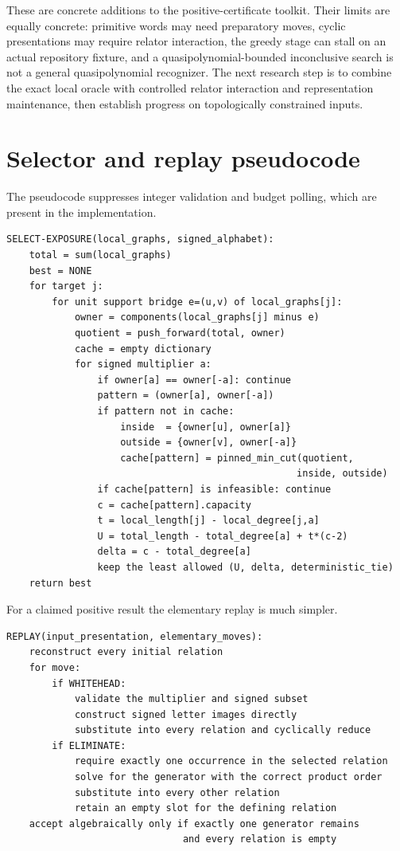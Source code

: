 \documentclass[11pt,letterpaper]{article}
\theoremstyle{definition}\newtheorem{definition}[theorem]{Definition}
\begin{document}
These are concrete additions to the positive-certificate toolkit. Their limits are equally concrete: primitive words may need preparatory moves, cyclic presentations may require relator interaction, the greedy stage can stall on an actual repository fixture, and a quasipolynomial-bounded inconclusive search is not a general quasipolynomial recognizer. The next research step is to combine the exact local oracle with controlled relator interaction and representation maintenance, then establish progress on topologically constrained inputs.

\appendix
\section{Selector and replay pseudocode}\label{app:code}
The pseudocode suppresses integer validation and budget polling, which are present in the implementation.
\begin{lstlisting}
SELECT-EXPOSURE(local_graphs, signed_alphabet):
    total = sum(local_graphs)
    best = NONE
    for target j:
        for unit support bridge e=(u,v) of local_graphs[j]:
            owner = components(local_graphs[j] minus e)
            quotient = push_forward(total, owner)
            cache = empty dictionary
            for signed multiplier a:
                if owner[a] == owner[-a]: continue
                pattern = (owner[a], owner[-a])
                if pattern not in cache:
                    inside  = {owner[u], owner[a]}
                    outside = {owner[v], owner[-a]}
                    cache[pattern] = pinned_min_cut(quotient,
                                                   inside, outside)
                if cache[pattern] is infeasible: continue
                c = cache[pattern].capacity
                t = local_length[j] - local_degree[j,a]
                U = total_length - total_degree[a] + t*(c-2)
                delta = c - total_degree[a]
                keep the least allowed (U, delta, deterministic_tie)
    return best
\end{lstlisting}
For a claimed positive result the elementary replay is much simpler.
\begin{lstlisting}
REPLAY(input_presentation, elementary_moves):
    reconstruct every initial relation
    for move:
        if WHITEHEAD:
            validate the multiplier and signed subset
            construct signed letter images directly
            substitute into every relation and cyclically reduce
        if ELIMINATE:
            require exactly one occurrence in the selected relation
            solve for the generator with the correct product order
            substitute into every other relation
            retain an empty slot for the defining relation
    accept algebraically only if exactly one generator remains
                               and every relation is empty
\end{lstlisting}
\end{document}

